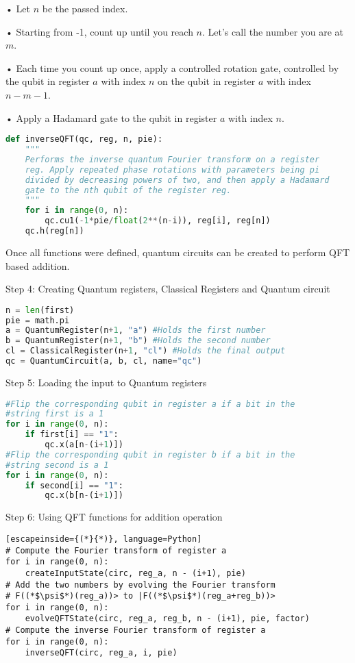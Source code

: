 \documentclass{cpp}
\begin{document}
•	Let $n$ be the passed index.

•	Starting from -1, count up until you reach $n$. Let’s call the number you are at $m$.

•	Each time you count up once, apply a controlled rotation gate, controlled by the qubit in register $a$ with index $n$ on the qubit in register $a$ with index $n-m-1$.

•	Apply a Hadamard gate to the qubit in register $a$ with index $n$.

\begin{lstlisting}[language=Python]
def inverseQFT(qc, reg, n, pie):
    """
    Performs the inverse quantum Fourier transform on a register 
    reg. Apply repeated phase rotations with parameters being pi    
    divided by decreasing powers of two, and then apply a Hadamard 
    gate to the nth qubit of the register reg.
    """
    for i in range(0, n):
        qc.cu1(-1*pie/float(2**(n-i)), reg[i], reg[n])
    qc.h(reg[n])
\end{lstlisting}

Once all functions were defined, quantum circuits can be created to perform QFT based addition.

\newpage
Step 4: Creating Quantum registers, Classical Registers and Quantum circuit

\begin{lstlisting}[language=Python]
n = len(first)
pie = math.pi
a = QuantumRegister(n+1, "a") #Holds the first number
b = QuantumRegister(n+1, "b") #Holds the second number 
cl = ClassicalRegister(n+1, "cl") #Holds the final output
qc = QuantumCircuit(a, b, cl, name="qc")
\end{lstlisting}

Step 5: Loading the input to Quantum registers

\begin{lstlisting}[language=Python]
#Flip the corresponding qubit in register a if a bit in the 
#string first is a 1
for i in range(0, n):
    if first[i] == "1":
        qc.x(a[n-(i+1)])
#Flip the corresponding qubit in register b if a bit in the 
#string second is a 1
for i in range(0, n):
    if second[i] == "1":
        qc.x(b[n-(i+1)])
\end{lstlisting}

Step 6: Using QFT functions for addition operation

\begin{lstlisting}[escapeinside={(*}{*)}, language=Python]
# Compute the Fourier transform of register a
for i in range(0, n):
    createInputState(circ, reg_a, n - (i+1), pie)
# Add the two numbers by evolving the Fourier transform   
# F((*$\psi$*)(reg_a))> to |F((*$\psi$*)(reg_a+reg_b))>
for i in range(0, n):
    evolveQFTState(circ, reg_a, reg_b, n - (i+1), pie, factor)
# Compute the inverse Fourier transform of register a
for i in range(0, n):
    inverseQFT(circ, reg_a, i, pie)
\end{lstlisting}
\end{document}
